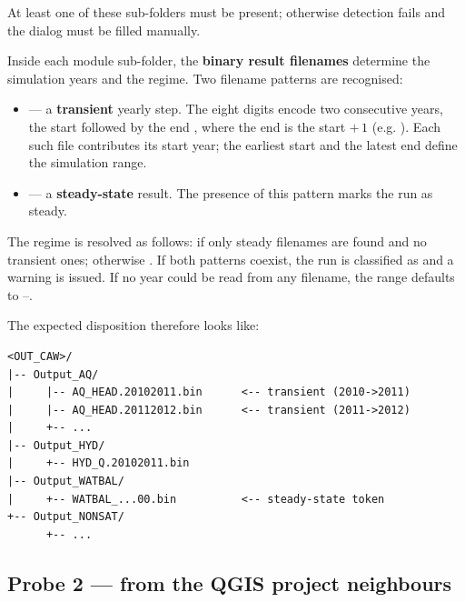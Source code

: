 At least one of these sub-folders must be present; otherwise detection
fails and the dialog must be filled manually.

Inside each module sub-folder, the \textbf{binary result filenames}
determine the simulation years and the regime. Two filename patterns are
recognised:

\begin{itemize}
    \item {} — a \textbf{transient}
        yearly step. The eight digits encode two consecutive years, the
        start  followed by the end , where the
        end is the start $+\,1$ (e.g. ). Each such file
        contributes its start year; the earliest start and the latest
        end define the simulation range.

    \item {} — a \textbf{steady-state}
        result. The presence of this pattern marks the run as steady.
\end{itemize}

The regime is resolved as follows:  if only steady
filenames are found and no transient ones; otherwise .
If both patterns coexist, the run is classified as 
and a warning is issued. If no year could be read from any filename, the
range defaults to --.

The expected disposition therefore looks like:

\begin{lstlisting}[caption={Expected layout of the \cawaqs~output directory.},captionpos=b,frame=lines,basicstyle=\ttfamily\footnotesize]
<OUT_CAW>/
|-- Output_AQ/
|     |-- AQ_HEAD.20102011.bin      <-- transient (2010->2011)
|     |-- AQ_HEAD.20112012.bin      <-- transient (2011->2012)
|     +-- ...
|-- Output_HYD/
|     +-- HYD_Q.20102011.bin
|-- Output_WATBAL/
|     +-- WATBAL_...00.bin          <-- steady-state token
+-- Output_NONSAT/
      +-- ...
\end{lstlisting}


\subsection{Probe 2 — from the QGIS project neighbours}
\label{ssec-auto-neighbors}

